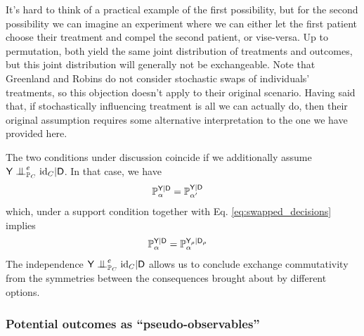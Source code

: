 It's hard to think of a practical example of the first possibility, but for the second possibility we can imagine an experiment where we can either let the first patient choose their treatment and compel the second patient, or vise-versa. Up to permutation, both yield the same joint distribution of treatments and outcomes, but this joint distribution will generally not be exchangeable. Note that Greenland and Robins do not consider stochastic swaps of individuals' treatments, so this objection doesn't apply to their original scenario. Having said that, if stochastically influencing treatment is all we can actually do, then their original assumption requires some alternative interpretation to the one we have provided here.

The two conditions under discussion coincide if we additionally assume $\RV{Y}\CI^e_{\prob{P}_C} \text{id}_C |\RV{D}$. In that case, we have
\begin{align}
    \mathbb{P}_\alpha^{\mathsf{Y}|\mathsf{D}} &= \mathbb{P}_{\alpha'}^{\mathsf{Y}|\mathsf{D}}
\end{align}
which, under a support condition together with Eq. \eqref{eq:swapped_decisions} implies
\begin{align}
    \mathbb{P}_\alpha^{\mathsf{Y}|\mathsf{D}} &= \mathbb{P}_{\alpha}^{\mathsf{Y}_\rho|\mathsf{D}_\rho}
\end{align}
The independence $\RV{Y}\CI^e_{\prob{P}_C} \text{id}_C |\RV{D}$ allows us to conclude exchange commutativity from the symmetries between the consequences brought about by different options.

\subsubsection{Potential outcomes as ``pseudo-observables''}\label{sec:exch_po}

